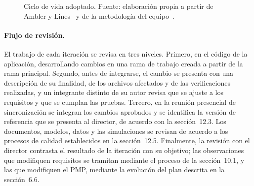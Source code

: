 \begin{figure}[htbp]
    \centering
    \caption{Ciclo de vida adoptado. Fuente: elaboración propia a partir de Ambler y Lines~\cite{ambler2012dad} y de la metodología del equipo~\cite{adaptacion2026}.}
    \label{fig:ciclo-vida}
\end{figure}

\paragraph{Flujo de revisión.}
El trabajo de cada iteración se revisa en tres niveles. Primero, en el código de la aplicación, desarrollando cambios en una rama de trabajo creada a partir de la rama principal. Segundo, antes de integrarse, el cambio se presenta con una descripción de su finalidad, de los archivos afectados y de las verificaciones realizadas, y un integrante distinto de su autor revisa que se ajuste a los requisitos y que se cumplan las pruebas. Tercero, en la reunión presencial de sincronización se integran los cambios aprobados y se identifica la versión de referencia que se presenta al director, de acuerdo con la sección~12.3. Los documentos, modelos, datos y las simulaciones se revisan de acuerdo a los procesos de calidad establecidos en la sección~12.5. Finalmente, la revisión con el director contrasta el resultado de la iteración con su objetivo; las observaciones que modifiquen requisitos se tramitan mediante el proceso de la sección~10.1, y las que modifiquen el PMP, mediante la evolución del plan descrita en la sección~6.6.

